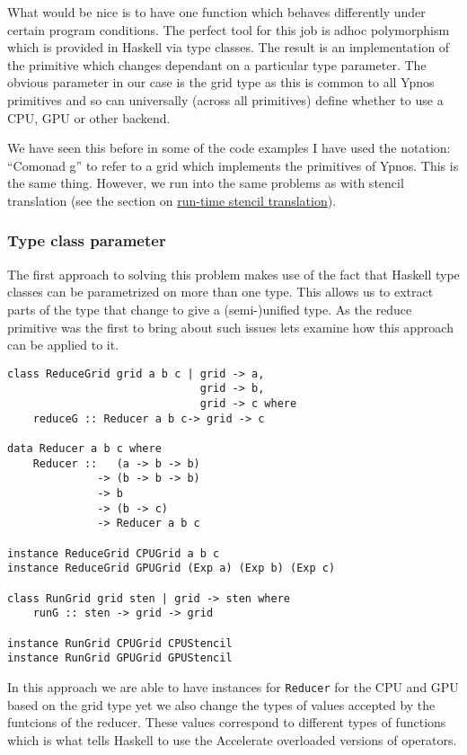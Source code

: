 What would be nice is to have one function which behaves differently
under certain program conditions. The perfect tool for this job is adhoc
polymorphism which is provided in Haskell via type classes. The result
is an implementation of the primitive which changes dependant on a
particular type parameter. The obvious parameter in our case is the grid
type as this is common to all Ypnos primitives and so can universally
(across all primitives) define whether to use a CPU, GPU or other
backend.

We have seen this before in some of the code examples I have used the
notation: ``Comonad g'' to refer to a grid which implements the
primitives of Ypnos. This is the same thing. However, we run into the
same problems as with stencil translation (see the section on
\hyperref[run-time]{run-time stencil translation}).

\subsubsection{Type class parameter}

The first approach to solving this problem makes use of the fact that
Haskell type classes can be parametrized on more than one type. This
allows us to extract parts of the type that change to give a
(semi-)unified type. As the reduce primitive was the first to bring
about such issues lets examine how this approach can be applied to it.

\begin{verbatim}
class ReduceGrid grid a b c | grid -> a,
                              grid -> b,
                              grid -> c where
    reduceG :: Reducer a b c-> grid -> c

data Reducer a b c where
    Reducer ::   (a -> b -> b)
              -> (b -> b -> b)
              -> b
              -> (b -> c)
              -> Reducer a b c

instance ReduceGrid CPUGrid a b c
instance ReduceGrid GPUGrid (Exp a) (Exp b) (Exp c)

class RunGrid grid sten | grid -> sten where
    runG :: sten -> grid -> grid

instance RunGrid CPUGrid CPUStencil
instance RunGrid GPUGrid GPUStencil
\end{verbatim}

In this approach we are able to have instances for \texttt{Reducer} for
the CPU and GPU based on the grid type yet we also change the types of
values accepted by the funtcions of the reducer. These values correspond
to different types of functions which is what tells Haskell to use the
Accelerate overloaded versions of operators.

